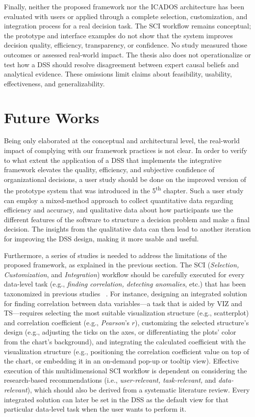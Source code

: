 \documentclass{sfuthesis}
\begin{document}
Finally, neither the proposed framework nor the ICADOS architecture has been evaluated with users or applied through a complete selection, customization, and integration process for a real decision task. The SCI workflow remains conceptual; the prototype and interface examples do not show that the system improves decision quality, efficiency, transparency, or confidence. No study measured those outcomes or assessed real-world impact. The thesis also does not operationalize or test how a DSS should resolve disagreement between expert causal beliefs and analytical evidence. These omissions limit claims about feasibility, usability, effectiveness, and generalizability.\par
\section{Future Works}
Being only elaborated at the conceptual and architectural level, the real-world impact of complying with our framework practices is not clear. In order to verify to what extent the application of a DSS that implements the integrative framework elevates the quality, efficiency, and subjective confidence of organizational decisions, a user study should be done on the improved version of the prototype system that was introduced in the 5\textsuperscript{th} chapter. Such a user study can employ a mixed-method approach to collect quantitative data regarding efficiency and accuracy, and qualitative data about how participants use the different features of the software to structure a decision problem and make a final decision. The insights from the qualitative data can then lead to another iteration for improving the DSS design, making it more usable and useful.\par
Furthermore, a series of studies is needed to address the limitations of the proposed framework, as explained in the previous section. The SCI (\textit{Selection, Customization}, and \textit{Integration}) workflow should be carefully executed for every data-level task (e.g., \textit{finding correlation, detecting anomalies}, etc.) that has been taxonomized in previous studies ~\cite{amar_low-level_2005,brehmer2013multi}. For instance, designing an integrated solution for finding correlation between data variables—a task that is aided by VIZ and TS—requires selecting the most suitable visualization structure (e.g., scatterplot) and correlation coefficient (e.g., \textit{Pearson}’s $r$), customizing the selected structure’s design (e.g., adjusting the ticks on the axes, or differentiating the plots’ color from the chart’s background), and integrating the calculated coefficient with the visualization structure (e.g., positioning the correlation coefficient value on top of the chart, or embedding it in an on-demand pop-up or tooltip view). Effective execution of this multidimensional SCI workflow is dependent on considering the research-based recommendations (i.e., \textit{user-relevant, task-relevant,} and \textit{data-relevant}), which should also be derived from a systematic literature review. Every integrated solution can later be set in the DSS as the default view for that particular data-level task when the user wants to perform it.\par
\end{document}

